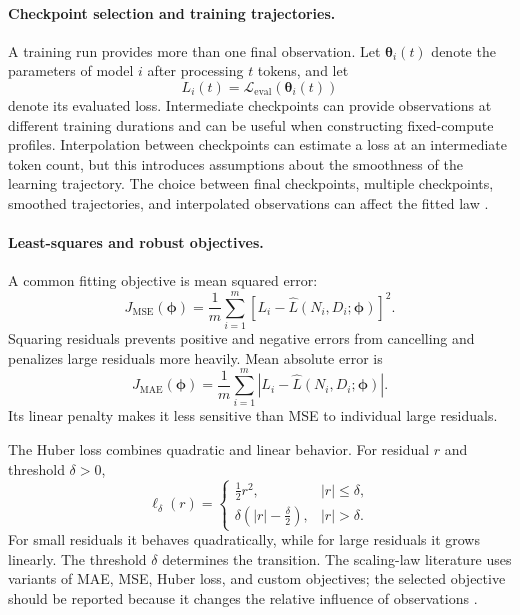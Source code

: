 \paragraph{Checkpoint selection and training trajectories.}
A training run provides more than one final observation. Let
\(\boldsymbol{\theta}_i(t)\) denote the parameters of model \(i\) after
processing \(t\) tokens, and let
\begin{equation}
    L_i(t)
    =
    \mathcal{L}_{\mathrm{eval}}(\boldsymbol{\theta}_i(t))
    \label{eq:scaling-learning-trajectory}
\end{equation}
denote its evaluated loss. Intermediate checkpoints can provide observations
at different training durations and can be useful when constructing
fixed-compute profiles. Interpolation between checkpoints can estimate a
loss at an intermediate token count, but this introduces assumptions about
the smoothness of the learning trajectory. The choice between final
checkpoints, multiple checkpoints, smoothed trajectories, and interpolated
observations can affect the fitted law \parencite{Li2025MisFitting}.

\paragraph{Least-squares and robust objectives.}
A common fitting objective is mean squared error:
\begin{equation}
    J_{\mathrm{MSE}}(\boldsymbol{\phi})
    =
    \frac{1}{m}
    \sum_{i=1}^{m}
    \left[
        L_i-\widehat{L}(N_i,D_i;\boldsymbol{\phi})
    \right]^2.
    \label{eq:scaling-mse}
\end{equation}
Squaring residuals prevents positive and negative errors from cancelling and
penalizes large residuals more heavily. Mean absolute error is
\begin{equation}
    J_{\mathrm{MAE}}(\boldsymbol{\phi})
    =
    \frac{1}{m}
    \sum_{i=1}^{m}
    \left|
        L_i-\widehat{L}(N_i,D_i;\boldsymbol{\phi})
    \right|.
    \label{eq:scaling-mae}
\end{equation}
Its linear penalty makes it less sensitive than MSE to individual large
residuals.

The Huber loss combines quadratic and linear behavior. For residual \(r\)
and threshold \(\delta>0\),
\begin{equation}
    \ell_{\delta}(r)
    =
    \begin{cases}
        \frac{1}{2}r^2,
            & |r|\leq\delta,\\[4pt]
        \delta\left(|r|-\frac{\delta}{2}\right),
            & |r|>\delta.
    \end{cases}
    \label{eq:scaling-huber}
\end{equation}
For small residuals it behaves quadratically, while for large residuals it
grows linearly. The threshold \(\delta\) determines the transition. The
scaling-law literature uses variants of MAE, MSE, Huber loss, and custom
objectives; the selected objective should be reported because it changes
the relative influence of observations \parencite{Li2025MisFitting}.

